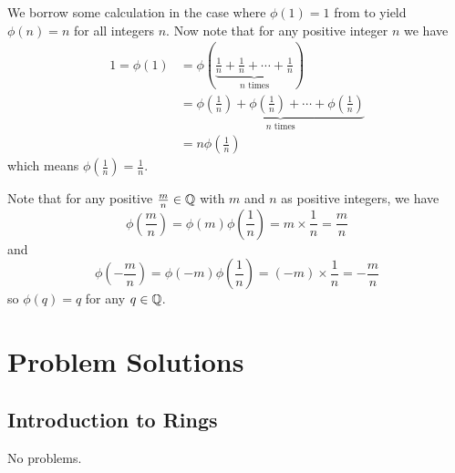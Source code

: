 \begin{questions}
    \item We borrow some calculation in the case where $\phi(1) = 1$ from  to yield $\phi(n) = n$ for all integers $n$. Now note that for any positive integer $n$ we have
    \begin{align*}
        1 = \phi(1) &= \phi\left(\underbrace{\frac1n + \frac1n + \cdots + \frac1n}_{n \text{ times}}\right)\\
        &= \underbrace{\phi\left(\frac1n\right) + \phi\left(\frac1n\right) + \cdots + \phi\left(\frac1n\right)}_{n \text{ times}}\\
        &= n\phi\left(\frac1n\right)
    \end{align*}
    which means $\phi\left(\frac1n\right) = \frac1n$.

    Note that for any positive $\frac mn \in \mathbb{Q}$ with $m$ and $n$ as positive integers, we have
    \[
        \phi\left(\frac mn\right) = \phi(m)\phi\left(\frac1n\right) = m \times \frac1n = \frac mn
    \]
    and
    \[
        \phi\left(-\frac mn\right) = \phi(-m)\phi\left(\frac1n\right) = (-m) \times \frac1n = -\frac mn
    \]
    so $\phi(q) = q$ for any $q \in \mathbb{Q}$.
\end{questions}

\chapter{Problem Solutions}
\section{Introduction to Rings}
No problems.

